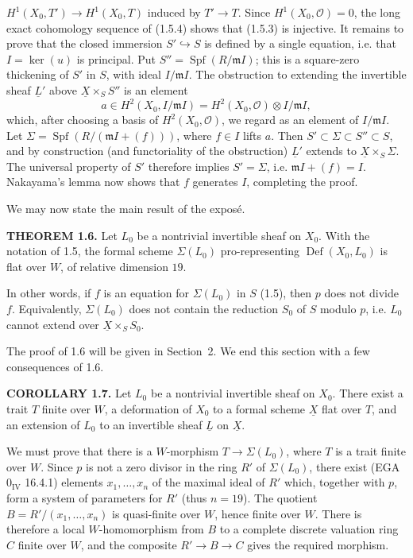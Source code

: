 \documentclass[10pt]{article}
\newcommand{\UX}{\underline{X}}
\newcommand{\UL}{\underline{L}}
\begin{document}
$H^1(X_0,T')\to H^1(X_0,T)$ induced by $T'\to T$. Since $H^1(X_0,\mathcal O)=0$, the long exact cohomology sequence of (1.5.4) shows that (1.5.3) is injective. It remains to prove that the closed immersion $S'\hookrightarrow S$ is defined by a single equation, i.e. that $I=\ker(u)$ is principal. Put $S''=\operatorname{Spf}(R/\mathfrak m I)$; this is a square-zero thickening of $S'$ in $S$, with ideal $I/\mathfrak m I$. The obstruction to extending the invertible sheaf $\UL'$ above $\UX\times_S S''$ is an element
\[
a\in H^2(X_0,I/\mathfrak m I)=H^2(X_0,\mathcal O)\otimes I/\mathfrak m I,
\]
which, after choosing a basis of $H^2(X_0,\mathcal O)$, we regard as an element of $I/\mathfrak m I$. Let $\Sigma=\operatorname{Spf}(R/(\mathfrak m I+(f)))$, where $f\in I$ lifts $a$. Then $S'\subset\Sigma\subset S''\subset S$, and by construction (and functoriality of the obstruction) $\UL'$ extends to $\UX\times_S\Sigma$. The universal property of $S'$ therefore implies $S'=\Sigma$, i.e. $\mathfrak m I+(f)=I$. Nakayama's lemma now shows that $f$ generates $I$, completing the proof.

We may now state the main result of the exposé.

\noindent\textbf{THEOREM 1.6.} Let $L_0$ be a nontrivial invertible sheaf on $X_0$. With the notation of 1.5, the formal scheme $\Sigma(L_0)$ pro-representing $\operatorname{Def}(X_0,L_0)$ is flat over $W$, of relative dimension $19$.

In other words, if $f$ is an equation for $\Sigma(L_0)$ in $S$ (1.5), then $p$ does not divide $f$. Equivalently, $\Sigma(L_0)$ does not contain the reduction $S_0$ of $S$ modulo $p$, i.e. $L_0$ cannot extend over $\UX\times_S S_0$.

The proof of 1.6 will be given in Section~2. We end this section with a few consequences of 1.6.

\noindent\textbf{COROLLARY 1.7.} Let $L_0$ be a nontrivial invertible sheaf on $X_0$. There exist a trait $T$ finite over $W$, a deformation of $X_0$ to a formal scheme $\UX$ flat over $T$, and an extension of $L_0$ to an invertible sheaf $\UL$ on $\UX$.
\newpage
\setcounter{footnote}{0}
\fontsize{10.2pt}{12.04pt}\selectfont

We must prove that there is a $W$-morphism $T\to\Sigma(L_0)$, where $T$ is a trait finite over $W$. Since $p$ is not a zero divisor in the ring $R'$ of $\Sigma(L_0)$, there exist (EGA $0_{\mathrm{IV}}$ 16.4.1) elements $x_1,\ldots,x_n$ of the maximal ideal of $R'$ which, together with $p$, form a system of parameters for $R'$ (thus $n=19$). The quotient $B=R'/(x_1,\ldots,x_n)$ is quasi-finite over $W$, hence finite over $W$. There is therefore a local $W$-homomorphism from $B$ to a complete discrete valuation ring $C$ finite over $W$, and the composite $R'\to B\to C$ gives the required morphism.
\end{document}
